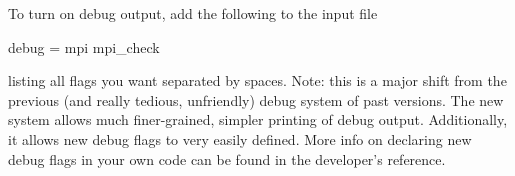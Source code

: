 To turn on debug output, add the following to the input file

\begin{ViFile}
debug = mpi  mpi_check
\end{ViFile}
listing all flags you want separated by spaces.
Note: this is a major shift from the previous (and really tedious, unfriendly) debug system of past versions.
The new system allows much finer-grained, simpler printing of debug output.
Additionally, it allows new debug flags to very easily defined.
More info on declaring new debug flags in your own code can be found in the developer's reference.
